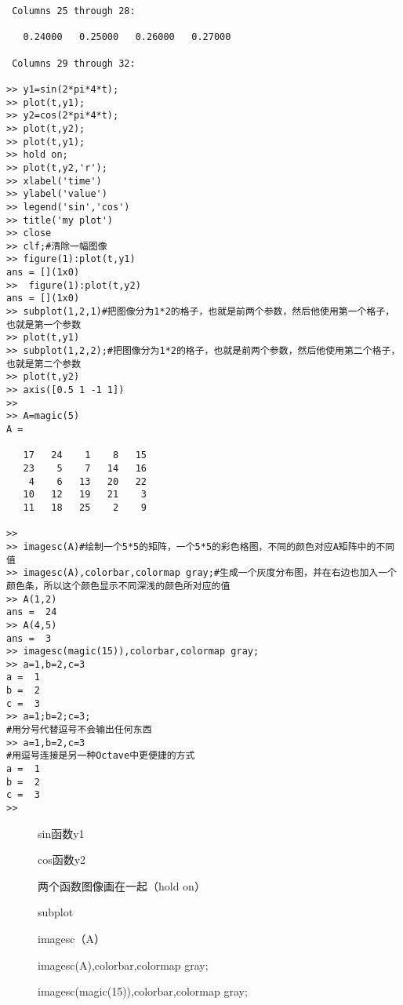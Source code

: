 \documentclass{article}
\begin{document}
\begin{CJK}{UTF8}{gbsn}
\begin{verbatim}
 Columns 25 through 28:

   0.24000   0.25000   0.26000   0.27000

 Columns 29 through 32:

>> y1=sin(2*pi*4*t);
>> plot(t,y1);
>> y2=cos(2*pi*4*t);
>> plot(t,y2);
>> plot(t,y1);
>> hold on;
>> plot(t,y2,'r');
>> xlabel('time')
>> ylabel('value')
>> legend('sin','cos')
>> title('my plot')
>> close
>> clf;#清除一幅图像
>> figure(1):plot(t,y1)
ans = [](1x0)
>>  figure(1):plot(t,y2)
ans = [](1x0)
>> subplot(1,2,1)#把图像分为1*2的格子，也就是前两个参数，然后他使用第一个格子，也就是第一个参数
>> plot(t,y1)
>> subplot(1,2,2);#把图像分为1*2的格子，也就是前两个参数，然后他使用第二个格子，也就是第二个参数
>> plot(t,y2)
>> axis([0.5 1 -1 1])
>>
>> A=magic(5)
A =

   17   24    1    8   15
   23    5    7   14   16
    4    6   13   20   22
   10   12   19   21    3
   11   18   25    2    9

>>
>> imagesc(A)#绘制一个5*5的矩阵，一个5*5的彩色格图，不同的颜色对应A矩阵中的不同值
>> imagesc(A),colorbar,colormap gray;#生成一个灰度分布图，并在右边也加入一个颜色条，所以这个颜色显示不同深浅的颜色所对应的值
>> A(1,2)
ans =  24
>> A(4,5)
ans =  3
>> imagesc(magic(15)),colorbar,colormap gray;
>> a=1,b=2,c=3
a =  1
b =  2
c =  3
>> a=1;b=2;c=3;
#用分号代替逗号不会输出任何东西
>> a=1,b=2,c=3
#用逗号连接是另一种Octave中更便捷的方式
a =  1
b =  2
c =  3
>>
\end{verbatim}
\begin{figure}[H]
\caption{sin函数y1}
\label{fig:113}
\end{figure}
\begin{figure}[H]
\caption{cos函数y2}
\label{fig:114}
\end{figure}
\begin{figure}[H]
\caption{两个函数图像画在一起（hold on）}
\label{fig:115}
\end{figure}
\begin{figure}[H]
\caption{subplot}
\label{fig:116}
\end{figure}
\begin{figure}[H]
\caption{imagesc（A）}
\label{fig:117}
\end{figure}
\begin{figure}[H]
\caption{imagesc(A),colorbar,colormap gray;}
\label{fig:118}
\end{figure}
\begin{figure}[H]
\caption{imagesc(magic(15)),colorbar,colormap gray;}
\label{fig:119}
\end{figure}

\end{CJK}
\end{document}
